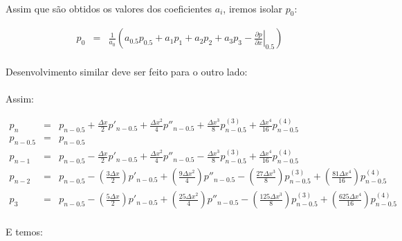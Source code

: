 \documentclass[introducao.tex]{subfiles}
\begin{document}
\paragraph{} Assim que são obtidos os valores dos coeficientes $a_i$, iremos isolar $p_0$:

\begin{eqnarray}
p_0 & = & \frac{1}{a_0}\left(a_{0.5}p_{0.5} + a_1 p_1 + a_2 p_2 + a_3 p_3 - \left.\frac{\partial p}{\partial x}\right|_{0.5}\right)
\end{eqnarray}

\paragraph{} Desenvolvimento similar deve ser feito para o outro lado:

\nonsymmetricleft

\paragraph{} Assim:

\begin{eqnarray}
p_n & = & p_{n-0.5} + \frac{\Delta x}{2}p'_{n-0.5} + \frac{\Delta x^2}{4}p''_{n-0.5} + \frac{\Delta x^3}{8} p^{(3)}_{n-0.5} + \frac{\Delta x^4}{16} p^{(4)}_{n-0.5} \nonumber\\
p_{n-0.5} & = & p_{n-0.5} \nonumber \\
p_{n-1} & = & p_{n-0.5} - \frac{\Delta x}{2}p'_{n-0.5} + \frac{\Delta x^2}{4}p''_{n-0.5} - \frac{\Delta x^3}{8} p^{(3)}_{n-0.5} + \frac{\Delta x^4}{16} p^{(4)}_{n-0.5}\nonumber \\
p_{n-2} & = & p_{n-0.5} - \left(\frac{3\Delta x}{2}\right)p'_{n-0.5} + \left(\frac{9\Delta x^2}{4}\right)p''_{n-0.5} - \left(\frac{27\Delta x^3}{8}\right)p^{(3)}_{n-0.5}+\left(\frac{81\Delta x^4}{16}\right)p^{(4)}_{n-0.5}\nonumber\\
p_3 & = & p_{n-0.5} - \left(\frac{5\Delta x}{2}\right)p'_{n-0.5} + \left(\frac{25\Delta x^2}{4}\right)p''_{n-0.5} - \left(\frac{125\Delta x^3}{8}\right)p^{(3)}_{n-0.5}+\left(\frac{625\Delta x^4}{16}\right)p^{(4)}_{n-0.5}\nonumber
\end{eqnarray}

\paragraph{} E temos:
\end{document}
